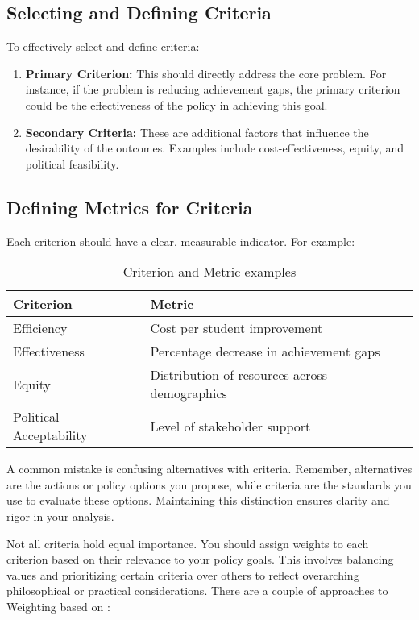 \documentclass{article}
\theoremstyle{definition}
\theoremstyle{plain}
\begin{document}
\subsection{Selecting and Defining Criteria}

To effectively select and define criteria:

\begin{enumerate}[label=\arabic*.]
    \item \textbf{Primary Criterion:} This should directly address the core problem. For instance, if the problem is reducing achievement gaps, the primary criterion could be the effectiveness of the policy in achieving this goal.
    
    \item \textbf{Secondary Criteria:} These are additional factors that influence the desirability of the outcomes. Examples include cost-effectiveness, equity, and political feasibility.
\end{enumerate}

\subsection{Defining Metrics for Criteria}

Each criterion should have a clear, measurable indicator. For example:

\begin{table}[H]
\caption{Criterion and Metric examples}
\centering 
\begin{tabular}{ll}
\hline
\textbf{Criterion} & \textbf{Metric} \\
\hline
Efficiency & Cost per student improvement \\
Effectiveness & Percentage decrease in achievement gaps \\
Equity & Distribution of resources across demographics \\
Political Acceptability & Level of stakeholder support \\
\hline
\end{tabular}
\end{table}

A common mistake is confusing alternatives with criteria. Remember, alternatives
are the actions or policy options you propose, while criteria are the standards
you use to evaluate these options. Maintaining this distinction ensures clarity
and rigor in your analysis. 

Not all criteria hold equal importance. You should assign weights to each criterion based
on their relevance to your policy goals. This involves balancing values
and prioritizing certain criteria over others to reflect overarching
philosophical or practical considerations. There are a couple of approaches to
Weighting based on \citet{Bardach2020}:
\end{document}

